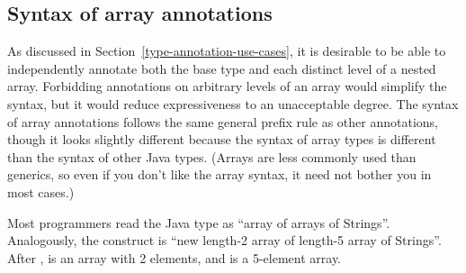 \documentclass[10pt]{article}
\begin{document}
% 
% 
% 
% 
% 
% 
% 
% 
% 



\subsection{Syntax of array annotations\label{array-syntax}}

As discussed in Section~\ref{type-annotation-use-cases}, it is
desirable to be able to independently annotate both the base type and
each distinct level of a nested array.
Forbidding annotations on arbitrary levels of an array would simplify the
syntax, but it would reduce expressiveness to an unacceptable degree.
The syntax of array annotations follows the same general prefix rule as
other annotations, though it looks slightly different because the syntax
of array types is different than the syntax of other Java types.
(Arrays are less commonly used than generics, so even if you don't like the
array syntax, it need not bother you in most cases.)

Most programmers read the Java type  as
``array of arrays of Strings''.  Analogously, the construct
 is ``new length-2 array of length-5 array of Strings''.
After ,  is an array with
2 elements, and  is a 5-element array.
\end{document}
